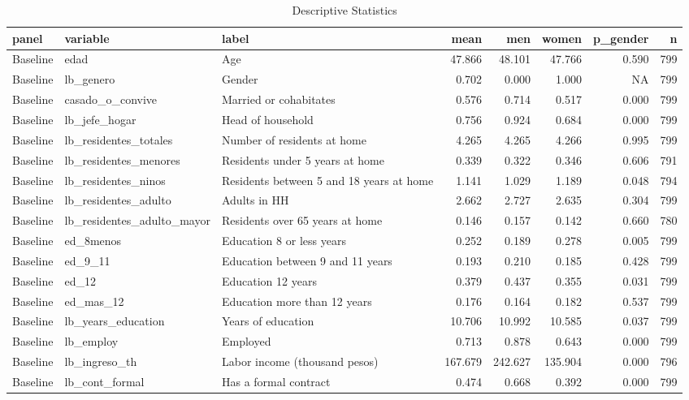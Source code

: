 \begin{table}

\caption{Descriptive Statistics}
\centering
\begin{tabular}[t]{lllrrrrr}
\toprule
panel & variable & label & mean & men & women & p\_gender & n\\
\midrule
Baseline & edad & Age & 47.866 & 48.101 & 47.766 & 0.590 & 799\\
Baseline & lb\_genero & Gender & 0.702 & 0.000 & 1.000 & NA & 799\\
Baseline & casado\_o\_convive & Married or cohabitates & 0.576 & 0.714 & 0.517 & 0.000 & 799\\
Baseline & lb\_jefe\_hogar & Head of household & 0.756 & 0.924 & 0.684 & 0.000 & 799\\
Baseline & lb\_residentes\_totales & Number of residents at home & 4.265 & 4.265 & 4.266 & 0.995 & 799\\
\addlinespace
Baseline & lb\_residentes\_menores & Residents under 5 years at home & 0.339 & 0.322 & 0.346 & 0.606 & 791\\
Baseline & lb\_residentes\_ninos & Residents between 5 and 18 years at home & 1.141 & 1.029 & 1.189 & 0.048 & 794\\
Baseline & lb\_residentes\_adulto & Adults in HH & 2.662 & 2.727 & 2.635 & 0.304 & 799\\
Baseline & lb\_residentes\_adulto\_mayor & Residents over 65 years at home & 0.146 & 0.157 & 0.142 & 0.660 & 780\\
Baseline & ed\_8menos & Education 8 or less years & 0.252 & 0.189 & 0.278 & 0.005 & 799\\
\addlinespace
Baseline & ed\_9\_11 & Education between 9 and 11 years & 0.193 & 0.210 & 0.185 & 0.428 & 799\\
Baseline & ed\_12 & Education 12 years & 0.379 & 0.437 & 0.355 & 0.031 & 799\\
Baseline & ed\_mas\_12 & Education more than 12 years & 0.176 & 0.164 & 0.182 & 0.537 & 799\\
Baseline & lb\_years\_education & Years of education & 10.706 & 10.992 & 10.585 & 0.037 & 799\\
Baseline & lb\_employ & Employed & 0.713 & 0.878 & 0.643 & 0.000 & 799\\
\addlinespace
Baseline & lb\_ingreso\_th & Labor income (thousand pesos) & 167.679 & 242.627 & 135.904 & 0.000 & 796\\
Baseline & lb\_cont\_formal & Has a formal contract & 0.474 & 0.668 & 0.392 & 0.000 & 799\\

\end{tabular}
\end{table}

